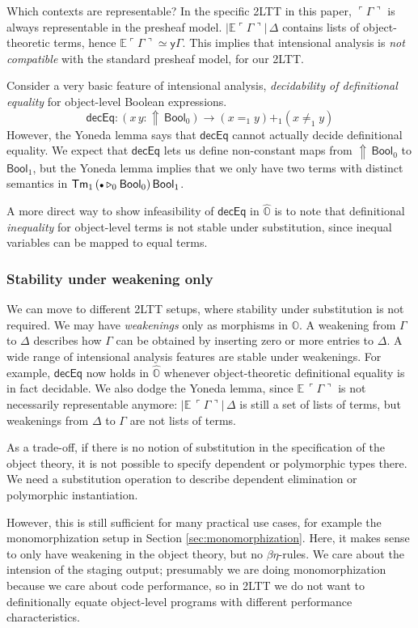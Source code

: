 \documentclass[acmsmall]{acmart}
\newcommand{\msf}[1]{\mathsf{#1}}
\newcommand{\mbb}[1]{\mathbb{#1}}
\newcommand{\ext}{\triangleright}
\newcommand{\Lift}{{\Uparrow}}
\newcommand{\mbbo}{\mbb{O}}
\newcommand{\Tm}{\msf{Tm}}
\newcommand{\Bool}{\msf{Bool}}
\newcommand{\emptycon}{\scaleobj{.75}\bullet}
\newcommand{\emb}[1]{\ulcorner#1\urcorner}
\newcommand{\hato}{\bm\hat{\mbbo}}
\newcommand{\ev}{\mbb{E}}
\theoremstyle{remark}
\newcommand{\yon}{\msf{y}}
\begin{document}
Which contexts are representable? In the specific 2LTT in this paper,
$\emb{\Gamma}$ is always representable in the presheaf
model. $|\ev{\emb{\Gamma}}|\,\Delta$ contains lists of object-theoretic terms,
hence $\ev{\emb{\Gamma}} \simeq \yon \Gamma$.  This implies that intensional
analysis is \emph{not compatible} with the standard presheaf model, for our
2LTT.

Consider a very basic feature of intensional analysis, \emph{decidability of
definitional equality} for object-level Boolean expressions.
\[
  \msf{decEq} : (x\,y : \Lift\,\Bool_0) \to (x =_1 y) +_1 (x \neq_1 y)
\]
However, the Yoneda lemma says that $\msf{decEq}$ cannot actually decide
definitional equality. We expect that $\msf{decEq}$ lets us define non-constant
maps from $\Lift\,\Bool_0$ to $\Bool_1$, but the Yoneda lemma implies that we
only have two terms with distinct semantics in $\Tm_1\,(\emptycon \ext_0
\Bool_0)\,\Bool_1$.

A more direct way to show infeasibility of $\msf{decEq}$ in $\hato$ is to note
that definitional \emph{inequality} for object-level terms is not stable under
substitution, since inequal variables can be mapped to equal terms.

\subsubsection{Stability under weakening only}
We can move to different 2LTT setups, where stability under substitution is not
required. We may have \emph{weakenings} only as morphisms in $\mbbo$.  A
weakening from $\Gamma$ to $\Delta$ describes how $\Gamma$ can be obtained by
inserting zero or more entries to $\Delta$. A wide range of intensional analysis
features are stable under weakenings. For example, $\msf{decEq}$ now holds in
$\hato$ whenever object-theoretic definitional equality is in fact decidable.
We also dodge the Yoneda lemma, since $\ev\,\emb{\Gamma}$ is not necessarily
representable anymore: $|\ev\,\emb{\Gamma}|\,\Delta$ is still a set of lists of
terms, but weakenings from $\Delta$ to $\Gamma$ are not lists of terms.

As a trade-off, if there is no notion of substitution in the specification of the
object theory, it is not possible to specify dependent or polymorphic types
there. We need a substitution operation to describe dependent elimination or
polymorphic instantiation.

However, this is still sufficient for many practical use cases, for example the
monomorphization setup in Section \ref{sec:monomorphization}. Here, it makes sense to only
have weakening in the object theory, but no $\beta\eta$-rules. We care about
the intension of the staging output; presumably we are doing monomorphization
because we care about code performance, so in 2LTT we do not want to
definitionally equate object-level programs with different performance
characteristics.
\end{document}
